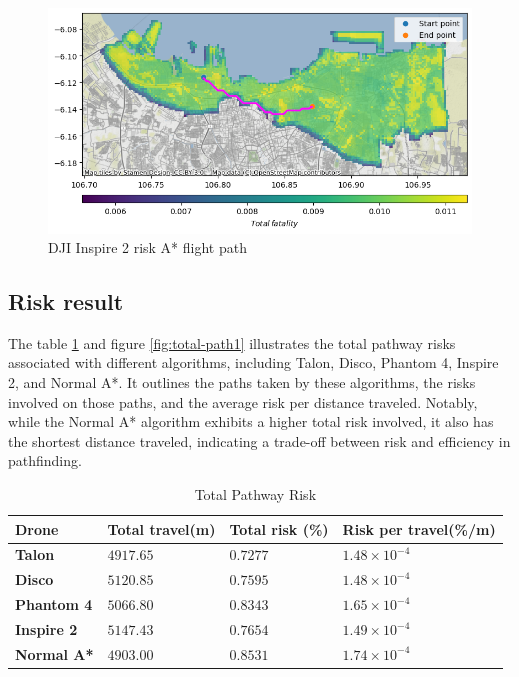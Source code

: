 \documentclass[12pt]{report}
\begin{document}
        \begin{figure}[H]
            \centering
            \includegraphics[width=\textwidth]{Plot/inspire/risk with fatality.png}
            \caption{DJI Inspire 2 risk A* flight path}
            \label{fig:inspire_path}
        \end{figure}

        \subsection{Risk result}
        The table \ref{tab:total-pathway-risk} and figure \ref{fig:total-path1} illustrates the total pathway risks
        associated with different algorithms, including Talon, Disco, Phantom 4, Inspire 2, and Normal A*. It outlines
        the paths taken by these algorithms, the risks involved on those paths, and the average risk per distance
        traveled. Notably, while the Normal A* algorithm exhibits a higher total risk involved, it also has the shortest
        distance traveled, indicating a trade-off between risk and efficiency in pathfinding.
        \begin{table}[H]
            \caption{Total Pathway Risk} %
            \centering
            \begin{tabular}{| l  l  l  l |}
                \hline
                \textbf{Drone} & \textbf{Total travel(m)} & \textbf{Total risk (\%)} & \textbf{Risk per travel(\%/m)} \\
                \hline
                \textbf{Talon} & \(4917.65\) & \(0.7277\) & \(1.48 \times 10^{-4}\) \\
                \hline
                \textbf{Disco} & \(5120.85\) & \(0.7595\) & \(1.48 \times 10^{-4}\) \\
                \hline
                \textbf{Phantom 4} & \(5066.80\) & \(0.8343\) & \(1.65 \times 10^{-4}\) \\
                \hline
                \textbf{Inspire 2} & \(5147.43\) & \(0.7654\) & \(1.49 \times 10^{-4}\) \\
                \hline
                \textbf{Normal A*} & \(4903.00\) & \(0.8531\) & \(1.74 \times 10^{-4}\) \\
                \hline
            \end{tabular}
            \label{tab:total-pathway-risk}
        \end{table}
\end{document}
